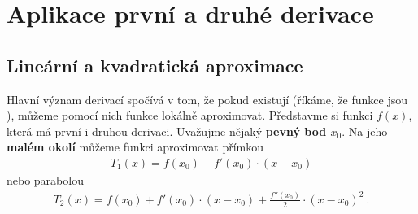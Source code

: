 \section{Aplikace první a druhé derivace}

\subsection{Lineární a kvadratická aproximace}

Hlavní význam derivací spočívá v tom, že pokud existují (říkáme, že funkce jsou ), můžeme pomocí nich funkce lokálně aproximovat.
Představme si funkci $f(x)$, která má první i druhou derivaci. Uvažujme nějaký \textbf{pevný bod $x_0$}. Na jeho \textbf{malém okolí} můžeme funkci aproximovat přímkou
\begin{align}
    \boxed{ T_1(x) = f(x_0) + f'(x_0) \cdot (x-x_0) }
\end{align}
nebo parabolou
\begin{align}
    \boxed{ T_2(x) = f(x_0) + f'(x_0) \cdot (x-x_0) +\frac{f''(x_0)}{2}  \cdot (x-x_0)^2 }\:.
\end{align}

